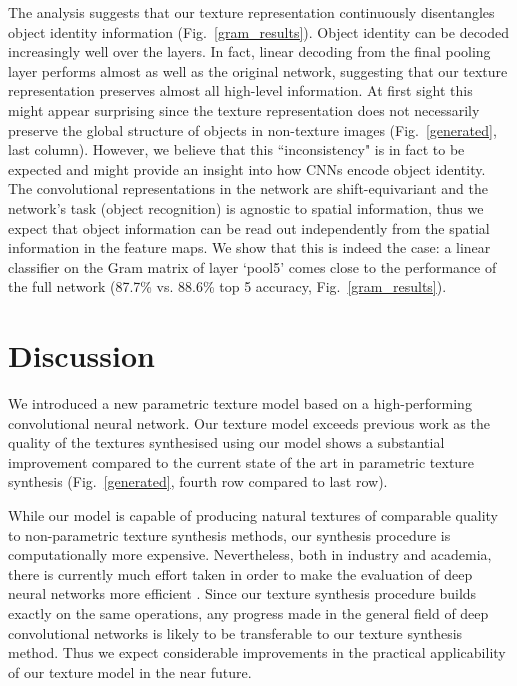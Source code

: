 \documentclass{article} %
\begin{document}
The analysis suggests that our texture representation continuously disentangles object identity information (Fig.~\ref{gram_results}). Object identity can be decoded increasingly well over the layers. In fact, linear decoding from the final pooling layer performs almost as well as the original network, suggesting that our texture representation preserves almost all high-level information. At first sight this might appear surprising since the texture representation does not necessarily preserve the global structure of objects in non-texture images (Fig.~\ref{generated}, last column). However, we believe that this ``inconsistency" is in fact to be expected and might provide an insight into how CNNs encode object identity. The convolutional representations in the network are shift-equivariant and the network's task (object recognition) is agnostic to spatial information, thus we expect that object information can be read out independently from the spatial information in the feature maps. We show that this is indeed the case: a linear classifier on the Gram matrix of layer `pool5' comes close to the performance of the full network (87.7\% vs. 88.6\% top 5 accuracy, Fig.~\ref{gram_results}). 

\section{Discussion}
We introduced a new parametric texture model based on a high-performing convolutional neural network.
Our texture model exceeds previous work as the quality of the textures synthesised using our model shows a substantial improvement compared to the current state of the art in parametric texture synthesis (Fig.~\ref{generated}, fourth row compared to last row).

While our model is capable of producing natural textures of comparable quality to non-parametric texture synthesis methods, our synthesis procedure is computationally more expensive. Nevertheless, both in industry and academia, there is currently much effort taken in order to make the evaluation of deep neural networks more efficient \cite{jaderberg_speeding_2014, denton_exploiting_2014, lebedev_speeding-up_2014}. Since our texture synthesis procedure builds exactly on the same operations, any progress made in the general field of deep convolutional networks is likely to be transferable to our texture synthesis method. Thus we expect considerable improvements in the practical applicability of our texture model in the near future.
\end{document}
